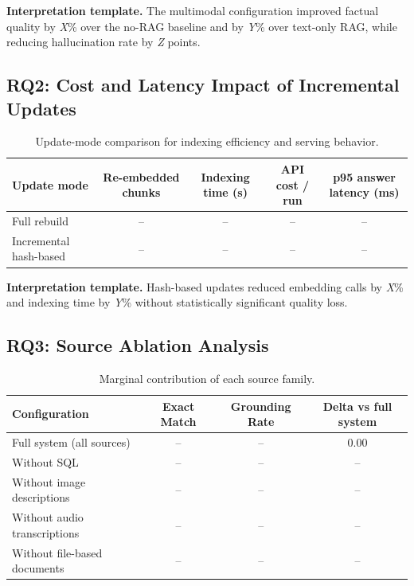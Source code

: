 \documentclass[11pt,a4paper]{article}
\begin{document}
\textbf{Interpretation template.} The multimodal configuration improved factual quality by \emph{X}\% over the no-RAG baseline and by \emph{Y}\% over text-only RAG, while reducing hallucination rate by \emph{Z} points.

\subsection{RQ2: Cost and Latency Impact of Incremental Updates}

\begin{table}[H]
\centering
\caption{Update-mode comparison for indexing efficiency and serving behavior.}
\label{tab:rq2-cost-latency}
\begin{tabular}{lcccc}
\toprule
Update mode & Re-embedded chunks & Indexing time (s) & API cost / run & p95 answer latency (ms) \\
\midrule
Full rebuild & -- & -- & -- & -- \\
Incremental hash-based & -- & -- & -- & -- \\
\bottomrule
\end{tabular}
\end{table}

\textbf{Interpretation template.} Hash-based updates reduced embedding calls by \emph{X}\% and indexing time by \emph{Y}\% without statistically significant quality loss.

\subsection{RQ3: Source Ablation Analysis}

\begin{table}[H]
\centering
\caption{Marginal contribution of each source family.}
\label{tab:rq3-ablation}
\begin{tabular}{lccc}
\toprule
Configuration & Exact Match & Grounding Rate & Delta vs full system \\
\midrule
Full system (all sources) & -- & -- & 0.00 \\
Without SQL & -- & -- & -- \\
Without image descriptions & -- & -- & -- \\
Without audio transcriptions & -- & -- & -- \\
Without file-based documents & -- & -- & -- \\
\bottomrule
\end{tabular}
\end{table}
\end{document}
